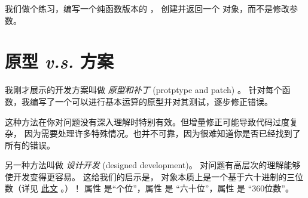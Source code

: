 {


我们做个练习，编写一个纯函数版本的   ，
创建并返回一个  对象，而不是修改参数。


\section{原型 {\em v.s.} 方案}

\label{prototype}
  
  


我刚才展示的开发方案叫做 {\em 原型和补丁} (protptype and patch) 。
针对每个函数，我编写了一个可以进行基本运算的原型并对其测试，逐步修正错误。


这种方法在你对问题没有深入理解时特别有效。但增量修正可能导致代码过度复杂，
因为需要处理许多特殊情况。也并不可靠，因为很难知道你是否已经找到了所有的错误。


另一种方法叫做 {\em 设计开发} (designed development)。
对问题有高层次的理解能够使开发变得更容易。
这给我们的启示是， 对象本质上是一个基于六十进制的三位数（详见 \href{http://en.wikipedia.org/wiki/Sexagesimal}{此文} 。）！
属性  是``个位''，属性  是 ``六十位''，属性  是 ``360位数''。

}
